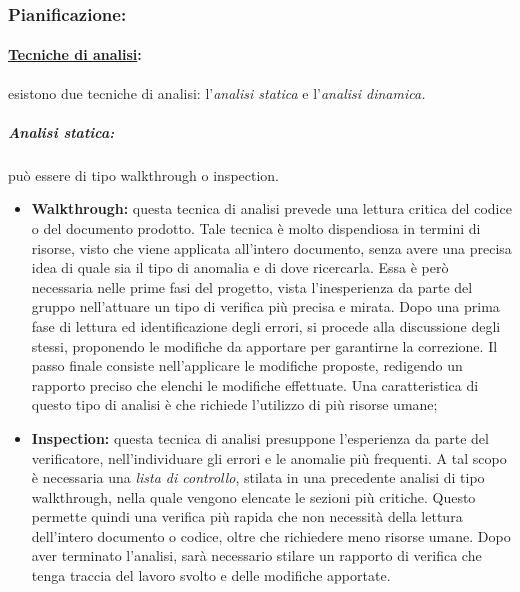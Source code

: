 \subsubsection{Pianificazione:}
\label{pianificazioneverifica}

\paragraph{\underline{Tecniche di analisi}:} esistono due tecniche di analisi: l'\textit{analisi statica} e l'\textit{analisi dinamica.}

\subparagraph{Analisi statica:} può essere di tipo walkthrough o inspection.
\begin{itemize}
 	\item \textbf{Walkthrough:} questa tecnica di analisi prevede una lettura critica del codice o del documento prodotto. Tale tecnica è molto dispendiosa in termini di risorse, visto che viene applicata all'intero documento, senza avere una precisa idea di quale sia il tipo di anomalia e di dove ricercarla. Essa è però necessaria nelle prime fasi del progetto, vista l'inesperienza da parte del gruppo nell'attuare un tipo di verifica più precisa e mirata. Dopo una prima fase di lettura ed identificazione degli errori, si procede alla discussione degli stessi, proponendo le modifiche da apportare per garantirne la correzione. Il passo finale consiste nell'applicare le modifiche proposte, redigendo un rapporto preciso che elenchi le modifiche effettuate. Una caratteristica di questo tipo di analisi è che richiede l'utilizzo di più risorse umane;
 	\item \textbf{Inspection:} questa tecnica di analisi presuppone l'esperienza da parte del verificatore, nell'individuare gli errori e le anomalie più frequenti. A tal scopo è necessaria una \textit{lista di controllo}, stilata in una precedente analisi di tipo walkthrough, nella quale vengono elencate le sezioni più critiche. Questo permette quindi una verifica più rapida che non necessità della lettura dell'intero documento o codice, oltre che richiedere meno risorse umane. Dopo aver terminato l'analisi, sarà necessario stilare un rapporto di verifica che tenga traccia del lavoro svolto e delle modifiche apportate.
\end{itemize}

